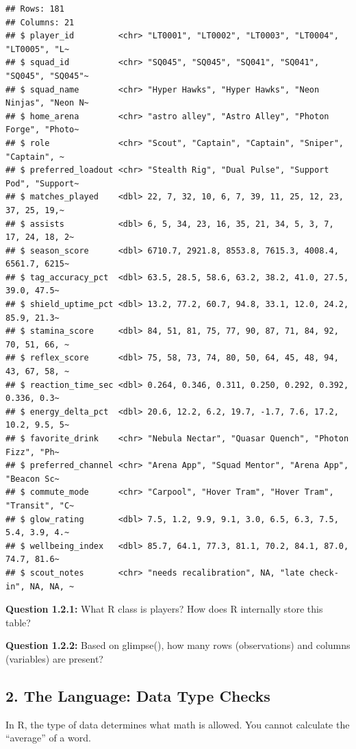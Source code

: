 \documentclass[
]{article}
\begin{document}
\begin{verbatim}
## Rows: 181
## Columns: 21
## $ player_id         <chr> "LT0001", "LT0002", "LT0003", "LT0004", "LT0005", "L~
## $ squad_id          <chr> "SQ045", "SQ045", "SQ041", "SQ041", "SQ045", "SQ045"~
## $ squad_name        <chr> "Hyper Hawks", "Hyper Hawks", "Neon Ninjas", "Neon N~
## $ home_arena        <chr> "astro alley", "Astro Alley", "Photon Forge", "Photo~
## $ role              <chr> "Scout", "Captain", "Captain", "Sniper", "Captain", ~
## $ preferred_loadout <chr> "Stealth Rig", "Dual Pulse", "Support Pod", "Support~
## $ matches_played    <dbl> 22, 7, 32, 10, 6, 7, 39, 11, 25, 12, 23, 37, 25, 19,~
## $ assists           <dbl> 6, 5, 34, 23, 16, 35, 21, 34, 5, 3, 7, 17, 24, 18, 2~
## $ season_score      <dbl> 6710.7, 2921.8, 8553.8, 7615.3, 4008.4, 6561.7, 6215~
## $ tag_accuracy_pct  <dbl> 63.5, 28.5, 58.6, 63.2, 38.2, 41.0, 27.5, 39.0, 47.5~
## $ shield_uptime_pct <dbl> 13.2, 77.2, 60.7, 94.8, 33.1, 12.0, 24.2, 85.9, 21.3~
## $ stamina_score     <dbl> 84, 51, 81, 75, 77, 90, 87, 71, 84, 92, 70, 51, 66, ~
## $ reflex_score      <dbl> 75, 58, 73, 74, 80, 50, 64, 45, 48, 94, 43, 67, 58, ~
## $ reaction_time_sec <dbl> 0.264, 0.346, 0.311, 0.250, 0.292, 0.392, 0.336, 0.3~
## $ energy_delta_pct  <dbl> 20.6, 12.2, 6.2, 19.7, -1.7, 7.6, 17.2, 10.2, 9.5, 5~
## $ favorite_drink    <chr> "Nebula Nectar", "Quasar Quench", "Photon Fizz", "Ph~
## $ preferred_channel <chr> "Arena App", "Squad Mentor", "Arena App", "Beacon Sc~
## $ commute_mode      <chr> "Carpool", "Hover Tram", "Hover Tram", "Transit", "C~
## $ glow_rating       <dbl> 7.5, 1.2, 9.9, 9.1, 3.0, 6.5, 6.3, 7.5, 5.4, 3.9, 4.~
## $ wellbeing_index   <dbl> 85.7, 64.1, 77.3, 81.1, 70.2, 84.1, 87.0, 74.7, 81.6~
## $ scout_notes       <chr> "needs recalibration", NA, "late check-in", NA, NA, ~
\end{verbatim}

\textbf{Question 1.2.1:} What R class is players? How does R internally
store this table?

\textbf{Question 1.2.2:} Based on glimpse(), how many rows
(observations) and columns (variables) are present?

\subsection{2. The Language: Data Type
Checks}\label{the-language-data-type-checks}

In R, the type of data determines what math is allowed. You cannot
calculate the ``average'' of a word.
\end{document}

